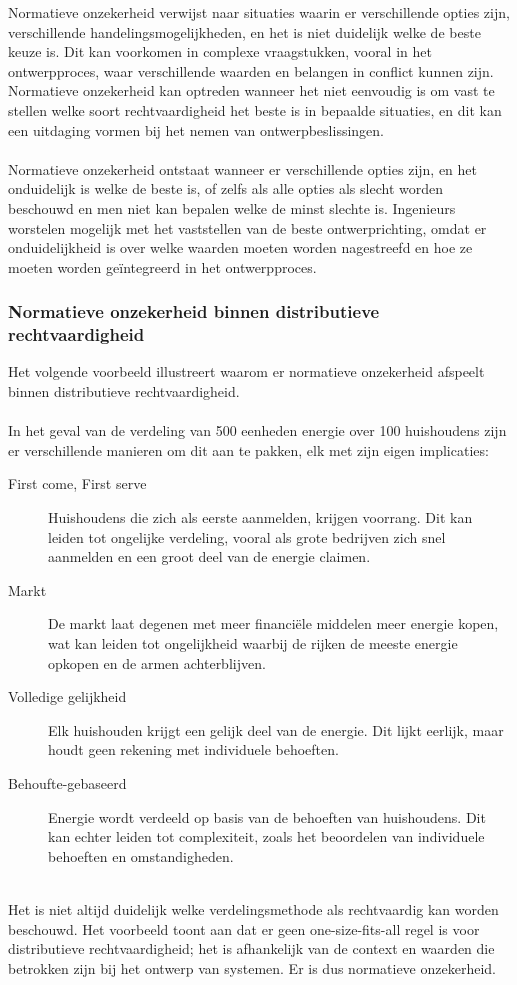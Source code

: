 \documentclass[../summary.tex]{subfiles}
\begin{document}
	Normatieve onzekerheid verwijst naar situaties waarin er verschillende opties zijn, verschillende handelingsmogelijkheden, en het is niet duidelijk welke de beste keuze is. Dit kan voorkomen in complexe vraagstukken, vooral in het ontwerpproces, waar verschillende waarden en belangen in conflict kunnen zijn. Normatieve onzekerheid kan optreden wanneer het niet eenvoudig is om vast te stellen welke soort rechtvaardigheid het beste is in bepaalde situaties, en dit kan een uitdaging vormen bij het nemen van ontwerpbeslissingen.\\
	\\
	Normatieve onzekerheid ontstaat wanneer er verschillende opties zijn, en het onduidelijk is welke de beste is, of zelfs als alle opties als slecht worden beschouwd en men niet kan bepalen welke de minst slechte is. Ingenieurs worstelen mogelijk met het vaststellen van de beste ontwerprichting, omdat er onduidelijkheid is over welke waarden moeten worden nagestreefd en hoe ze moeten worden geïntegreerd in het ontwerpproces.
	
	\subsubsection{Normatieve onzekerheid binnen distributieve rechtvaardigheid}
	
	Het volgende voorbeeld illustreert waarom er normatieve onzekerheid afspeelt binnen distributieve rechtvaardigheid. \\
	\\
	In het geval van de verdeling van 500 eenheden energie over 100 huishoudens zijn er verschillende manieren om dit aan te pakken, elk met zijn eigen implicaties:
	\begin{description}
		\item[First come, First serve] 	Huishoudens die zich als eerste aanmelden, krijgen voorrang. Dit kan leiden tot ongelijke verdeling, vooral als grote bedrijven zich snel aanmelden en een groot deel van de energie claimen.
		\item[Markt] De markt laat degenen met meer financiële middelen meer energie kopen, wat kan leiden tot ongelijkheid waarbij de rijken de meeste energie opkopen en de armen achterblijven.
		\item[Volledige gelijkheid] Elk huishouden krijgt een gelijk deel van de energie. Dit lijkt eerlijk, maar houdt geen rekening met individuele behoeften.
		\item[Behoufte-gebaseerd] Energie wordt verdeeld op basis van de behoeften van huishoudens. Dit kan echter leiden tot complexiteit, zoals het beoordelen van individuele behoeften en omstandigheden.
	\end{description}
	\ \\
	Het is niet altijd duidelijk welke verdelingsmethode als rechtvaardig kan worden beschouwd. Het voorbeeld toont aan dat er geen one-size-fits-all regel is voor distributieve rechtvaardigheid; het is afhankelijk van de context en waarden die betrokken zijn bij het ontwerp van systemen. Er is dus normatieve onzekerheid.
	\newpage
	
\end{document}
